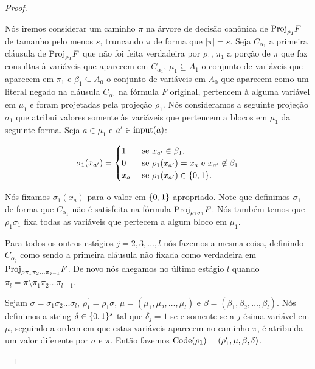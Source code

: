 \begin{proof}
\begin{enumerate}
	Nós iremos considerar um caminho $\pi$ na árvore de decisão canônica de $\text{Proj}_{\rho_{1}}F$ de tamanho pelo menos $s$, truncando $\pi$ de forma que $\lvert \pi \rvert = s$. Seja $C_{\alpha_{1}}$ a primeira cláusula de $\text{Proj}_{\rho_{1}}F$ que não foi feita verdadeira por $\rho_{1}$, $\pi_{1}$ a porção de $\pi$ que faz consultas à variáveis que aparecem em $C_{\alpha_{1}}$, $\mu_{1} \subseteq A_{1}$ o conjunto de variáveis que aparecem em $\pi_{1}$ e  $\beta_{1} \subseteq A_{0}$ o conjunto de variáveis em $A_{0}$ que aparecem como um literal negado na cláusula $C_{\alpha_{1}}$ na fórmula $F$ original, pertencem à alguma variável em $\mu_{1}$ e foram projetadas pela projeção $\rho_{1}$. Nós consideramos a seguinte projeção $\sigma_{1}$ que atribui valores somente às variáveis que pertencem a blocos em $\mu_{1}$ da seguinte forma. Seja $a \in \mu_{1}$ e $a^{\prime} \in \text{input}(a)$:
	
	\begin{equation} \label{sigma_i_def}
		\sigma_{1}(x_{a^{\prime}}) = \begin{cases}
					      	1 & \text{ se } x_{a^{\prime}} \in \beta_{1}. \\
					      	0 & \text{ se } \rho_{1}(x_{a^{\prime}}) = x_{a} \text{ e } x_{a^{\prime}} \not\in \beta_{1} \\
					      	x_{a} & \text{ se } \rho_{1}(x_{a^{\prime}}) \in \{0, 1\}.
					      \end{cases}
	\end{equation}
	
	Nós fixamos $\sigma_{1}(x_{a})$ para o valor em $\{0, 1\}$ apropriado. Note que definimos $\sigma_{1}$ de forma que $C_{\alpha_{1}}$ não é satisfeita na fórmula $\text{Proj}_{\rho_{1}\sigma_{1}}F$. Nós também temos que $\rho_{1}\sigma_{1}$ fixa todas as variáveis que pertecem a algum bloco em $\mu_{1}$.
	
	Para todos os outros estágios $j = 2, 3, \dots, l$ nós fazemos a mesma coisa, definindo $C_{\alpha_{j}}$ como sendo a primeira cláusula não fixada como verdadeira em $\text{Proj}_{\rho\pi_{1}\pi_{2}\dots\pi_{j - 1}}F$. De novo nós chegamos no último estágio $l$ quando $\pi_{l} = \pi \setminus \pi_{1}\pi_{2}\dots\pi_{l - 1}$.
	
	Sejam $\sigma = \sigma_{1}\sigma_{2}\dots\sigma_{l}$, $\rho_{1}^{\prime} = \rho_{1}\sigma$, $\mu = (\mu_{1}, \mu_{2}, \dots, \mu_{l})$ e $\beta = (\beta_{1}, \beta_{2}, \dots, \beta_{l})$. Nós definimos a string $\delta \in \{0, 1\}^{s}$ tal que $\delta_{j} = 1$ se e somente se a $j$-ésima variável em $\mu$, seguindo a ordem em que estas variáveis aparecem no caminho $\pi$, é atribuida um valor diferente por $\sigma$ e $\pi$. Então fazemos $\text{Code}(\rho_{1}) = (\rho_{1}^{\prime}, \mu, \beta, \delta)$.
	

\end{enumerate}
\end{proof}
